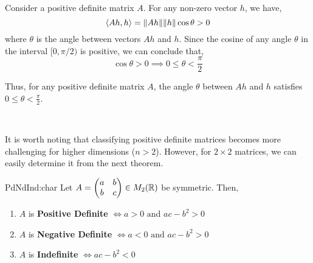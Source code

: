 \documentclass[../Analysis-3.tex]{subfiles}
\begin{document}
\begin{Eg}{}{}
\begin{enumerate}
  \end{enumerate}
\end{Eg}

Consider a positive definite matrix $A$. For any non-zero vector $h$, we have,
\[
  \left\langle Ah, h \right\rangle = \norm{Ah}\norm{h}\cos{\theta} > 0
\]
where $\theta$ is the angle between vectors $Ah$ and $h$. Since the cosine of any angle $\theta$ in the interval $[0, \pi/2)$ is positive, we can conclude that,
\[
  \cos{\theta} > 0 \implies \boxed{0 \leq \theta < \frac{\pi}{2}}
\]

Thus, for any positive definite matrix $A$, the angle $\theta$ between $Ah$ and $h$ satisfies $0 \leq \theta < \frac{\pi}{2}$.

\

It is worth noting that classifying positive definite matrices becomes more challenging for higher dimensions ($n > 2$). However, for $2 \times 2$ matrices, we can easily determine it from the next theorem.

\begin{Thm}{}{PdNdInd:char}
  Let $A = \begin{pmatrix}
      a & b \\
      b & c
    \end{pmatrix} \in M_2(\mathbb{R}) $ be symmetric. Then,
  \begin{enumerate}[label=(\roman*)]
    \item $A$ is \textbf{Positive Definite} $ \Longleftrightarrow a > 0 \text{ and } ac -b^2 >0 $ \label{charpd}
    \item $A$ is \textbf{Negative Definite} $ \Longleftrightarrow a < 0 \text{ and } ac -b^2 >0 $ \label{charnd}
    \item $A$ is \textbf{Indefinite} $ \Longleftrightarrow ac -b^2 <0 $ \label{charind}
  \end{enumerate}
\end{Thm}
\end{document}
